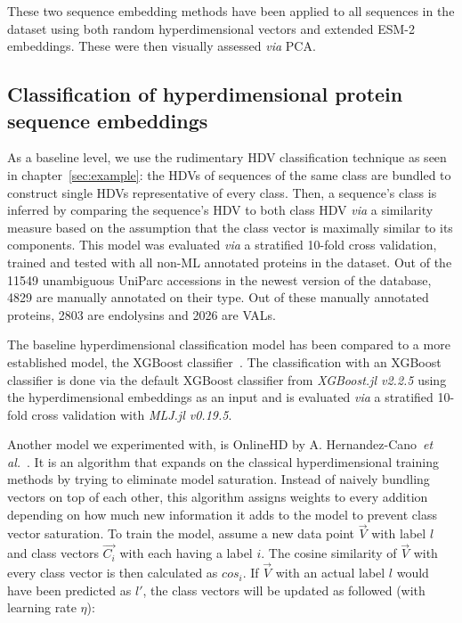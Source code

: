 These two sequence embedding methods have been applied to all sequences in the dataset using both random hyperdimensional vectors and extended ESM-2 embeddings. These were then visually assessed \textit{via} PCA.

\subsection*{Classification of hyperdimensional protein sequence embeddings}
As a baseline level, we use the rudimentary HDV classification technique as seen in chapter~\ref{sec:example}: the HDVs of sequences of the same class are bundled to construct single HDVs representative of every class. Then, a sequence's class is inferred by comparing the sequence's HDV to both class HDV \textit{via} a similarity measure based on the assumption that the class vector is maximally similar to its components. This model was evaluated \textit{via} a stratified 10-fold cross validation, trained and tested with all non-ML annotated proteins in the dataset. Out of the 11549 unambiguous UniParc accessions in the newest version of the database, 4829 are manually annotated on their type. Out of these manually annotated proteins, 2803 are endolysins and 2026 are VALs.

The baseline hyperdimensional classification model has been compared to a more established model, the XGBoost classifier~\cite{xgboost}. The classification with an XGBoost classifier is done via the default XGBoost classifier from \textit{XGBoost.jl v2.2.5} using the hyperdimensional embeddings as an input and is evaluated \textit{via} a stratified 10-fold cross validation with \textit{MLJ.jl v0.19.5}.

Another model we experimented with, is OnlineHD by A. Hernandez-Cano~\textit{et al.}~\cite{onlinehd}. It is an algorithm that expands on the classical hyperdimensional training methods by trying to eliminate model saturation. Instead of naively bundling vectors on top of each other, this algorithm assigns weights to every addition depending on how much new information it adds to the model to prevent class vector saturation. To train the model, assume a new data point $\vec{V}$ with label $l$ and class vectors $\vec{C_{i}}$ with each having a label $i$. The cosine similarity of $\vec{V}$ with every class vector is then calculated as $cos_{i}$. If $\vec{V}$ with an actual label $l$ would have been predicted as $l'$, the class vectors will be updated as followed (with learning rate $\eta$):

